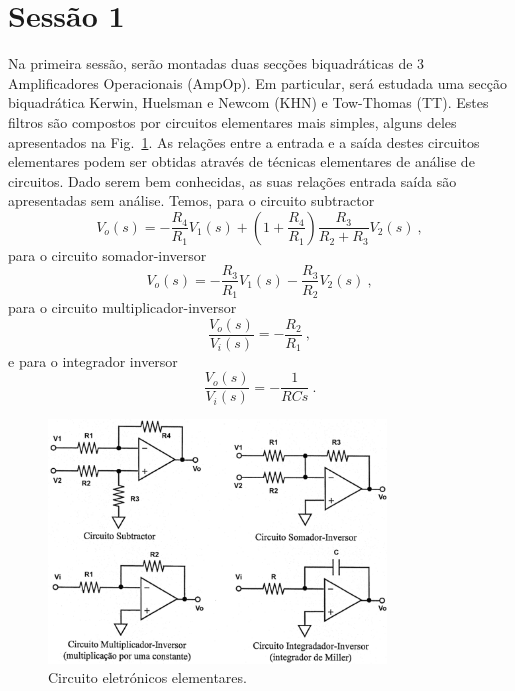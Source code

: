 \section{Sessão 1}

Na primeira sessão, serão montadas duas secções biquadráticas de 3 Amplificadores Operacionais (AmpOp). Em particular, será estudada uma secção biquadrática Kerwin, Huelsman e Newcom (KHN) e Tow-Thomas (TT). Estes filtros são compostos por circuitos elementares mais simples, alguns deles apresentados na Fig.~\ref{fig:circuitosElemnatres}. As relações entre a entrada e a saída destes circuitos elementares podem ser obtidas através de técnicas elementares de análise de circuitos. Dado serem bem conhecidas, as suas relações entrada saída são apresentadas sem análise. Temos, para o circuito subtractor
\begin{equation}\label{eq:subtartor}
    V_o(s)=-\frac{R_4}{R_1}V_1(s) +\left(1+\frac{R_4}{R_1}\right)\frac{R_3}{R_2+R_3}V_2(s)\:,
\end{equation}
para o circuito somador-inversor\label{eq:sum_inv}
\begin{equation}
    V_o(s)= -\frac{R_3}{R_1}V_1(s) -\frac{R_3}{R_2}V_2(s)\:,
\end{equation}
para o circuito multiplicador-inversor 
\begin{equation}\label{eq:multInv}
    \frac{V_o(s)}{V_i(s)} = -\frac{R_2}{R_1}\:,
\end{equation}
e para o integrador inversor
\begin{equation}\label{eq:int_inv}
    \frac{V_o(s)}{V_i(s)} = -\frac{1}{RCs}\:.
\end{equation}

\begin{figure}[h!]
    \centering
    \includegraphics[width = 0.8\textwidth]{Imagens/circuitosElementares.png}
    \caption{Circuito eletrónicos elementares.}
    \label{fig:circuitosElemnatres}
\end{figure}

